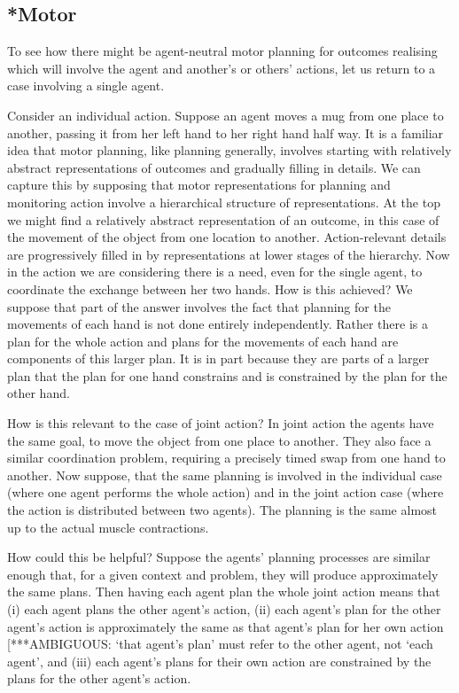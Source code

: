 \documentclass[12pt,\papersize]{extarticle}
\begin{document}
\subsection{*Motor}
To see how there might be agent-neutral motor planning for outcomes realising which will involve the agent and another's or others' actions, 
let us return to a case involving a single agent.



Consider  an individual action.
Suppose an agent moves a mug from one place to another, passing it from her left hand to her right hand half way.
It is a familiar idea that motor planning, like planning generally, involves starting with relatively abstract representations of outcomes and gradually filling in details.
We can capture this by supposing that 
motor representations for planning and monitoring action involve a hierarchical structure of representations.
At the top we might find a relatively abstract representation of an outcome, in this case of the movement of the object from one location to another.
Action-relevant details are progressively filled in by representations at lower stages of the hierarchy. 
Now in the action we are considering there is a need, even for the single agent, to coordinate the exchange between her two hands.
How is this achieved? 
We suppose that part of the answer involves the fact that planning for the movements of each hand is not done entirely independently.
Rather there is a plan for the whole action
and plans for the movements of each hand are components of this larger plan.
It is in part because they are parts of a larger plan that the plan for one hand constrains and is constrained by the plan for the other hand.





How is this relevant to the case of joint action?
In joint action the agents have the same goal, to move the object from one place to another.
They also face a similar coordination problem, requiring a precisely timed swap from one hand to another.
Now suppose, that the same planning is involved in the individual case (where one agent performs the whole action) and in the joint action case (where the action is distributed between two agents).
The planning is the same almost up to the actual muscle contractions.

How could this be helpful?
Suppose the agents' planning processes are similar enough that, for a given context and problem, they will produce approximately the same plans.
Then having each agent plan the whole joint action means that (i) each agent plans the other agent's action,
(ii) each agent's plan for the other agent's action is approximately the same as that agent's plan for her own action [***AMBIGUOUS: `that agent's plan' must refer to the other agent, not `each agent',
and 
(iii) each  agent's plans for their own action are constrained by the plans for the other agent's action.
\end{document}
